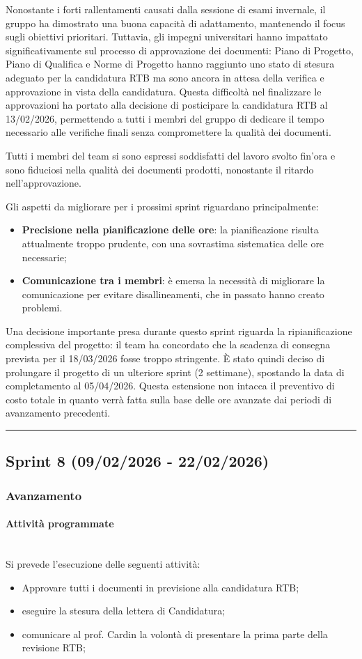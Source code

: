 \documentclass[10pt, letterpaper]{article}
\newcommand{\trisubsection}[1]{\paragraph{#1}\mbox{}\\}
\begin{document}
Nonostante i forti rallentamenti causati dalla sessione di esami invernale, il gruppo ha dimostrato una buona capacità di adattamento, mantenendo il focus sugli 
obiettivi prioritari. Tuttavia, gli impegni universitari hanno impattato significativamente sul processo di approvazione dei documenti: Piano di Progetto, Piano di 
Qualifica e Norme di Progetto hanno raggiunto uno stato di stesura adeguato per la candidatura RTB ma sono ancora in attesa della verifica e approvazione in vista 
della candidatura. Questa difficoltà nel finalizzare le approvazioni ha portato alla decisione di posticipare la candidatura RTB al 13/02/2026, permettendo a tutti 
i membri del gruppo di dedicare il tempo necessario alle verifiche finali senza compromettere la qualità dei documenti.

Tutti i membri del team si sono espressi soddisfatti del lavoro svolto fin'ora e sono fiduciosi nella qualità dei documenti prodotti, nonostante il ritardo nell'approvazione.

Gli aspetti da migliorare per i prossimi sprint riguardano principalmente:
\begin{itemize}
    \item \textbf{Precisione nella pianificazione delle ore}: la pianificazione risulta attualmente troppo prudente, con una sovrastima sistematica delle ore necessarie;
    \item \textbf{Comunicazione tra i membri}: è emersa la necessità di migliorare la comunicazione per evitare disallineamenti, che in passato hanno creato problemi.
\end{itemize}

Una decisione importante presa durante questo sprint riguarda la ripianificazione complessiva del progetto: il team ha concordato che la scadenza di consegna prevista per il 18/03/2026 fosse troppo stringente. È stato quindi deciso di prolungare il progetto di un ulteriore sprint (2 settimane), spostando la data di completamento al 05/04/2026. Questa estensione non intacca il preventivo di costo totale in quanto verrà fatta sulla base delle ore avanzate dai periodi di avanzamento precedenti.

\vspace{1em}
\hrule
\vspace{1em}

\subsection{Sprint 8 (09/02/2026 - 22/02/2026)}
\subsubsection{Avanzamento}
\trisubsection{Attività programmate}
Si prevede l'esecuzione delle seguenti attività:
\begin{itemize}
    \item Approvare tutti i documenti in previsione alla candidatura RTB;
    \item eseguire la stesura della lettera di Candidatura;
    \item comunicare al prof. Cardin la volontà di presentare la prima parte della revisione RTB;
\end{itemize}
\end{document}
